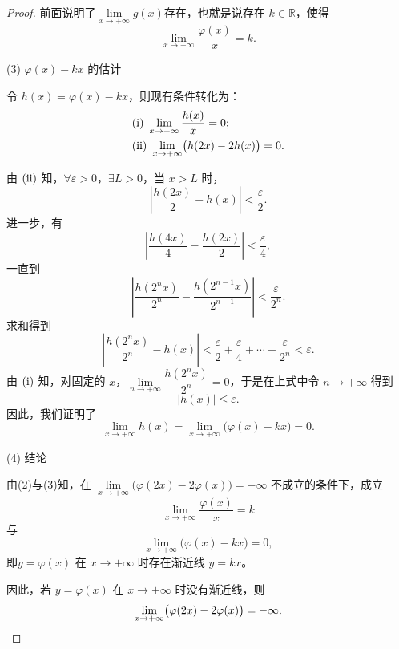 \begin{4b}
\begin{enumerate}
\begin{proof}
前面说明了$\lim\limits_{x\rightarrow+\infty}g(x)$存在，也就是说存在 $k\in\mathbb{R}$，使得
\[\lim_{x\rightarrow+\infty}\frac{\varphi(x)}{x}=k.\]

(3) $\varphi(x)-kx$ 的估计

令 $h(x)=\varphi(x)-kx$，则现有条件转化为：
\begin{align}
&({\rm i})\ \lim_{x\rightarrow+\infty}\frac{h(x)}{x}=0; \\
&({\rm ii})\ \lim_{x\rightarrow+\infty}\bigl( h(2x)-2h(x) \bigr)=0.
\end{align}

由 $({\rm ii})$ 知，$\forall\varepsilon>0$，$\exists L>0$，当 $x>L$ 时，
\[\left|\frac{h(2x)}{2}-h(x)\right|<\frac{\varepsilon}{2}.\]
进一步，有
\[\left|\frac{h(4x)}{4}-\frac{h(2x)}{2}\right|<\frac{\varepsilon}{4},\]
一直到
\[\left|\frac{h(2^nx)}{2^n}-\frac{h(2^{n-1}x)}{2^{n-1}}\right|<\frac{\varepsilon}{2^n}.\]
求和得到
\[\left|\frac{h(2^nx)}{2^n}-h(x)\right|<\frac{\varepsilon}{2}
+\frac{\varepsilon}{4}+\cdots+\frac{\varepsilon}{2^n}<\varepsilon.\]
由 $({\rm i})$ 知，对固定的 $x$，$\lim\limits_{n\rightarrow+\infty}\dfrac{h(2^nx)}{2^n}=0$，于是在上式中令 $n\rightarrow+\infty$ 得到
\[|h(x)| \leqslant \varepsilon.\]
因此，我们证明了
\[\lim_{x\rightarrow+\infty}h(x)
=\lim_{x\rightarrow+\infty}\bigl( \varphi(x)-kx \bigr)=0.\]

(4) 结论

由(2)与(3)知，在 $\lim\limits_{x\rightarrow+\infty}\bigl( \varphi(2x)-2\varphi(x) \bigr)=-\infty$ 不成立的条件下，成立
\[
\lim_{x\rightarrow+\infty}\frac{\varphi(x)}{x}=k
\]
与
\[
\lim_{x\rightarrow{+\infty}}\bigl( \varphi(x)-kx \bigr)=0,
\]
即$y=\varphi(x)$ 在 $x\rightarrow+\infty$ 时存在渐近线 $y=kx$。

因此，若 $y=\varphi(x)$ 在 $x\rightarrow+\infty$ 时没有渐近线，则
\[
\lim_{x\rightarrow+\infty}\bigl( \varphi(2x)-2\varphi(x) \bigr)=-\infty.\qedhere
\]

\end{proof}
\end{enumerate}
\end{4b}